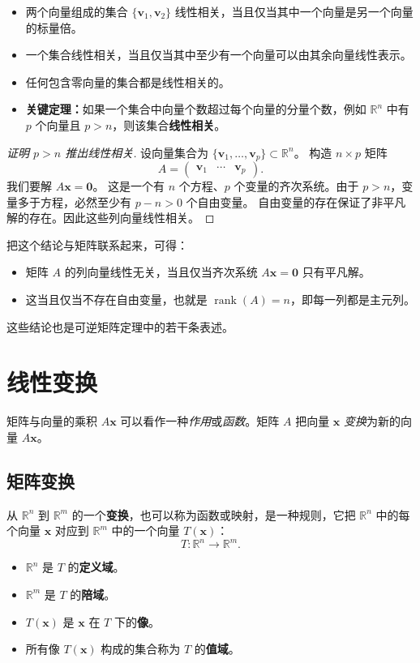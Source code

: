 \begin{property}[关于线性无关的若干结论]
\begin{itemize}
    \item 两个向量组成的集合 $\{\mathbf{v}_1,\mathbf{v}_2\}$ 线性相关，当且仅当其中一个向量是另一个向量的标量倍。
    \item 一个集合线性相关，当且仅当其中至少有一个向量可以由其余向量线性表示。
    \item 任何包含零向量的集合都是线性相关的。
    \item \textbf{关键定理：}如果一个集合中向量个数超过每个向量的分量个数，例如 $\mathbb{R}^n$ 中有 $p$ 个向量且 $p>n$，则该集合\textbf{线性相关}。
\end{itemize}
\end{property}
\begin{proof}[证明 $p>n$ 推出线性相关]
设向量集合为 $\{\mathbf{v}_1,\ldots,\mathbf{v}_p\}\subset\mathbb{R}^n$。
构造 $n\times p$ 矩阵
\[
A=\begin{pmatrix}\mathbf{v}_1&\cdots&\mathbf{v}_p\end{pmatrix}.
\]
我们要解 $A\mathbf{x}=\mathbf{0}$。
这是一个有 $n$ 个方程、$p$ 个变量的齐次系统。由于 $p>n$，变量多于方程，必然至少有 $p-n>0$ 个自由变量。
自由变量的存在保证了非平凡解的存在。因此这些列向量线性相关。
\end{proof}

把这个结论与矩阵联系起来，可得：
\begin{itemize}
    \item 矩阵 $A$ 的列向量线性无关，当且仅当齐次系统 $A\mathbf{x}=\mathbf{0}$ 只有平凡解。
    \item 这当且仅当不存在自由变量，也就是 $\operatorname{rank}(A)=n$，即每一列都是主元列。
\end{itemize}
这些结论也是可逆矩阵定理中的若干条表述。

\section{线性变换}
矩阵与向量的乘积 $A\mathbf{x}$ 可以看作一种\emph{作用}或\emph{函数}。矩阵 $A$ 把向量 $\mathbf{x}$ \emph{变换}为新的向量 $A\mathbf{x}$。

\subsection{矩阵变换}
从 $\mathbb{R}^n$ 到 $\mathbb{R}^m$ 的一个\textbf{变换}，也可以称为函数或映射，是一种规则，它把 $\mathbb{R}^n$ 中的每个向量 $\mathbf{x}$ 对应到 $\mathbb{R}^m$ 中的一个向量 $T(\mathbf{x})$：
\[ T:\mathbb{R}^n\to\mathbb{R}^m. \]
\begin{itemize}
    \item $\mathbb{R}^n$ 是 $T$ 的\textbf{定义域}。
    \item $\mathbb{R}^m$ 是 $T$ 的\textbf{陪域}。
    \item $T(\mathbf{x})$ 是 $\mathbf{x}$ 在 $T$ 下的\textbf{像}。
    \item 所有像 $T(\mathbf{x})$ 构成的集合称为 $T$ 的\textbf{值域}。
\end{itemize}

